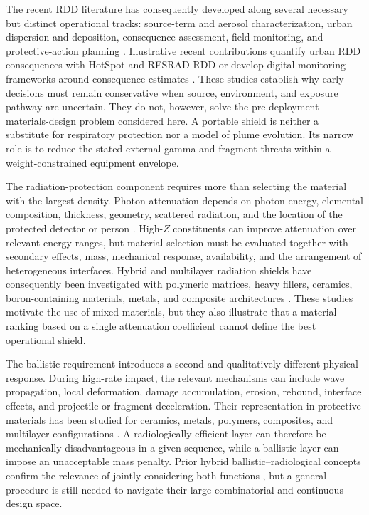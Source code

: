 \documentclass[12pt]{elsarticle}
\begin{document}
	The recent RDD literature has consequently developed along several necessary but distinct operational tracks: source-term and aerosol characterization, urban dispersion and deposition, consequence assessment, field monitoring, and protective-action planning \cite{DHS2025RDD,AlShami2026,BrambillaEtAl2023}. Illustrative recent contributions quantify urban RDD consequences with HotSpot and RESRAD-RDD \cite{ObooEtAl2024} or develop digital monitoring frameworks around consequence estimates \cite{AlrammahAlShareef2023}. These studies establish why early decisions must remain conservative when source, environment, and exposure pathway are uncertain. They do not, however, solve the pre-deployment materials-design problem considered here. A portable shield is neither a substitute for respiratory protection nor a model of plume evolution. Its narrow role is to reduce the stated external gamma and fragment threats within a weight-constrained equipment envelope.

	The radiation-protection component requires more than selecting the material with the largest density. Photon attenuation depends on photon energy, elemental composition, thickness, geometry, scattered radiation, and the location of the protected detector or person \cite{Attix1986,Knoll2010,ShultisFaw2011,Turner2007}. High-$Z$ constituents can improve attenuation over relevant energy ranges, but material selection must be evaluated together with secondary effects, mass, mechanical response, availability, and the arrangement of heterogeneous interfaces. Hybrid and multilayer radiation shields have consequently been investigated with polymeric matrices, heavy fillers, ceramics, boron-containing materials, metals, and composite architectures \cite{MoreEtAl2021,PrabhuEtAl2023,GilysEtAl2022,AbualroosEtAl2019,ChangEtAl2015,AlDhuhaibatEtAl2021,AlmurayshidEtAl2021,AlavianTavakoli2019,UddinEtAl2020,AbdalsalamEtAl2020}. These studies motivate the use of mixed materials, but they also illustrate that a material ranking based on a single attenuation coefficient cannot define the best operational shield.
	
	The ballistic requirement introduces a second and qualitatively different physical response. During high-rate impact, the relevant mechanisms can include wave propagation, local deformation, damage accumulation, erosion, rebound, interface effects, and projectile or fragment deceleration. Their representation in protective materials has been studied for ceramics, metals, polymers, composites, and multilayer configurations \cite{Hazell2015,Zukas1990,Meyers1994,Crouch2016,JohnsonCook1983,JohnsonHolmquist1994,TasdemirciTunusoglu2017,JiangEtAl2022,NunesEtAl2019,BiswasDatta2022,WangEtAl2024}. A radiologically efficient layer can therefore be mechanically disadvantageous in a given sequence, while a ballistic layer can impose an unacceptable mass penalty. Prior hybrid ballistic--radiological concepts confirm the relevance of jointly considering both functions \cite{MarxRabiei2017CMF,Derradji2020Hybrid,Mehelli2021BallisticRadiation}, but a general procedure is still needed to navigate their large combinatorial and continuous design space.
\end{document}
